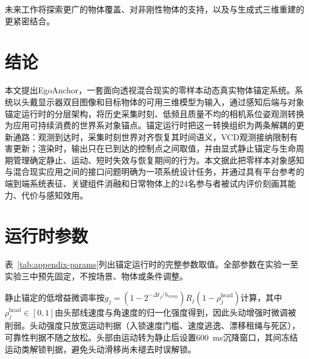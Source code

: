 \documentclass[review]{vgtc}
\begin{document}
未来工作将探索更广的物体覆盖、对非刚性物体的支持，以及与生成式三维重建的更紧密结合。

\section{结论}\label{sec:conclusion}

本文提出EgoAnchor，一套面向透视混合现实的零样本动态真实物体锚定系统。系统以头戴显示器双目图像和目标物体的可用三维模型为输入，通过感知后端与对象锚定运行时的分层架构，将历史采集时刻、低频且质量不均的相机系位姿观测转换为应用可持续消费的世界系对象锚点。锚定运行时把这一转换组织为两条解耦的更新通路：观测到达时，采集时刻世界对齐恢复其时间语义，VCD观测接纳限制有害更新；渲染时，输出只在已到达的控制点之间取值，并由显式静止锚定与生命周期管理确定静止、运动、短时失效与恢复期间的行为。本文据此把零样本对象感知与混合现实应用之间的接口问题明确为一项系统设计任务，并通过具有平台参考的端到端系统表征、关键组件消融和日常物体上的24名参与者被试内评价刻画其能力、代价与感知效用。

\raggedbottom




\clearpage
\appendix

\section{运行时参数}\label{sec:appendix}

表~\ref{tab:appendix-params}列出锚定运行时的完整参数取值。全部参数在实验一至实验三中预先固定，不按场景、物体或条件调整。

静止锚定的低增益微调率按$g_j = (1 - 2^{-\Delta t_j / h_{\mathrm{creep}}}) R_j (1 - \rho_j^{\mathrm{head}})$计算，其中$\rho_j^{\mathrm{head}} \in [0,1]$由头部线速度与角速度的归一化强度得到，因此头动增强时微调被削弱。头动强度只放宽运动判据（入锁速度门槛、速度逃逸、漂移租绳与死区），可靠性判据不随之放松。头部由运动转为静止后设置600~ms沉降窗口，其间冻结运动类解锁判据，避免头动滑移尚未褪去时误解锁。
\end{document}
